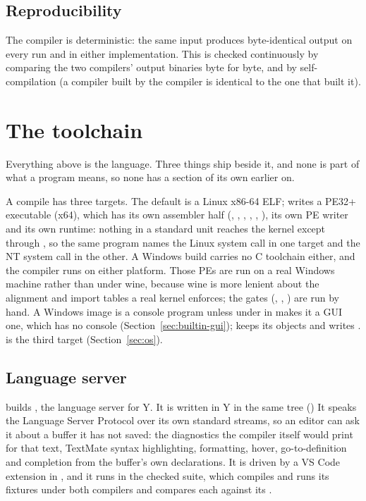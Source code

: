 \subsection{Reproducibility}

The compiler is deterministic: the same input produces byte-identical
output on every run and in either implementation. This is checked
continuously by comparing the two compilers' output binaries byte for
byte, and by self-compilation (a compiler built by the compiler is
identical to the one that built it).

\section{The toolchain}
\label{sec:toolchain}

Everything above is the language. Three things ship beside it, and none is part
of what a program means, so none has a section of its own earlier on.

A compile has three targets. The default is a Linux x86-64 ELF;
 writes a PE32+ executable (x64), which has its own
assembler half (, , , ,
, ), its own PE writer and its own runtime: nothing in a standard
unit reaches the kernel except through , so the
same program names the Linux system call in one target and the NT system call
in the other. A Windows build carries no C toolchain either, and the compiler
runs on either platform. Those PEs are run on a real Windows machine rather
than under wine, because wine is more lenient about the alignment and import
tables a real kernel enforces; the gates (, ,
) are run by hand. A Windows image is a console program unless
 under \ic{[package]} in  makes it a GUI one, which has no console (Section~\ref{sec:builtin-gui});
 keeps its objects and writes
.  is the third target
(Section~\ref{sec:os}).

\subsection{Language server}

 builds , the language server for
\textsf{Y}. It is written in \textsf{Y} in the same tree () It speaks the Language
Server Protocol over its own standard streams, so an editor can ask it about a
buffer it has not saved: the diagnostics the compiler itself would print for
that text, TextMate syntax highlighting, formatting, hover, go-to-definition and completion
from the buffer's own declarations. It is driven by a VS Code extension in
, and it runs in the checked suite, which compiles and runs
its fixtures under both compilers and compares each against its
.

